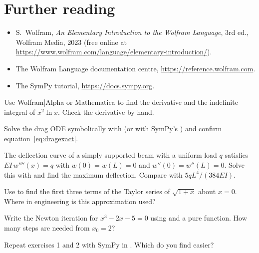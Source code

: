 \section{Further reading}
\begin{itemize}
\item S.~Wolfram, \emph{An Elementary Introduction to the Wolfram Language}, 3rd ed.,
  Wolfram Media, 2023 (free online at \url{https://www.wolfram.com/language/elementary-introduction/}).
\item The Wolfram Language documentation centre, \url{https://reference.wolfram.com}.
\item The SymPy tutorial, \url{https://docs.sympy.org}.
\end{itemize}

\begin{exercises}
\item Use Wolfram|Alpha or Mathematica to find the derivative and the indefinite integral
  of $x^2\ln x$. Check the derivative by hand.
\item Solve the drag ODE symbolically with  (or with SymPy's )
  and confirm equation~\eqref{eq:dragexact}.
\item The deflection curve of a simply supported beam with a uniform load $q$ satisfies
  $EI\,w''''(x) = q$ with $w(0) = w(L) = 0$ and $w''(0) = w''(L) = 0$. Solve this with
   and find the maximum deflection. Compare with $5qL^4/(384EI)$.
\item Use  to find the first three terms of the Taylor series of
  $\sqrt{1+x}$ about $x = 0$. Where in engineering is this approximation used?
\item Write the Newton iteration for $x^3 - 2x - 5 = 0$ using  and a pure
  function. How many steps are needed from $x_0 = 2$?
\item Repeat exercises 1 and 2 with SymPy in \py. Which do you find easier?
\end{exercises}
